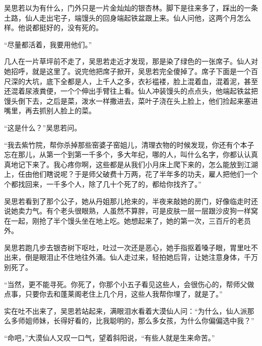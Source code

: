 吴思若以为有什么，门外只是一片金灿灿的银杏林。脚下是往来多了，踩出的一条土路，仙人走出宅子，端馒头的回身端起铁盆跟上来。仙人问他，这两个月怎么样。他说都挺好的，没有死的。

“尽量都活着，我要用他们。”

几人在一片草坪前不走了，吴思若走近才发现，那是染了绿色的一张席子。仙人对她招呼，就是这里了。说完他把席子掀开，吴思若完全傻掉了。席子下面是一个百尺深的大坑，底下全都是人，上千人之多，衣衫褴褛，脸上混着血，混着泥，甚至还混着尿液粪便，一个个伸出手臂往上看。仙人冲装馒头的点点头，他端起铁盆把馒头倒下去，之后是菜，泼水一样撒进去，菜叶子浇在头上脸上，他们捡起来塞进嘴里，再去抓别人脸上的菜。

“这是什么？”吴思若问。

“我去紫竹院，帮你杀掉那些窑婆子窑姐儿，清理衣物的时候发现，你还有个本子忘在那儿，从第一个到第一千多个，多大年纪，哪的人，叫什么名字，你都认认真真地记下来了。我心疼你啊，这些都是从我们小月床上爬下来的，怎么能放到江湖上，任由他们瞎说呢？于是师父破费十万两，花了半年多的功夫，雇人把他们一个个都找回来，一千多个人，除了几十个死了的，都给你找齐了。”

吴思若看到了那个公子，她从丹姐那儿抢来的，半夜来敲她的房门，好像临走时还说她卖力气。有个老头很眼熟，人虽然不算胖，可是皮肤一层一层跟沙皮狗一样窝在一起，刚抢了半个馒头坐在地上吃。她想起来了，她的第一次，三百斤的老员外。

吴思若跑几步去银杏树下呕吐，吐过一次还是恶心，她手指抠着嗓子眼，胃里吐不出来，倒是眼泪止不住地往外涌。仙人走过来，轻拍她后背，让她注意身体，千万别死了。

“当然，更不能寻死。你死了，你那个小五子看见这些人，会很伤心的，帮师父做点事，只要你去和蓬莱阁老住上几个月，这些人我帮你埋了，就是了。”

实在吐不出来了，吴思若站起来，满眼泪水看着大漠仙人问：“为什么，仙人派那么多师姐师妹，长得好看的，比我聪明的，那么多女孩，为什么你偏偏选中我？”

“命吧，”大漠仙人又叹一口气，望着斜阳说，“有些人就是生来命苦。”

\newpage